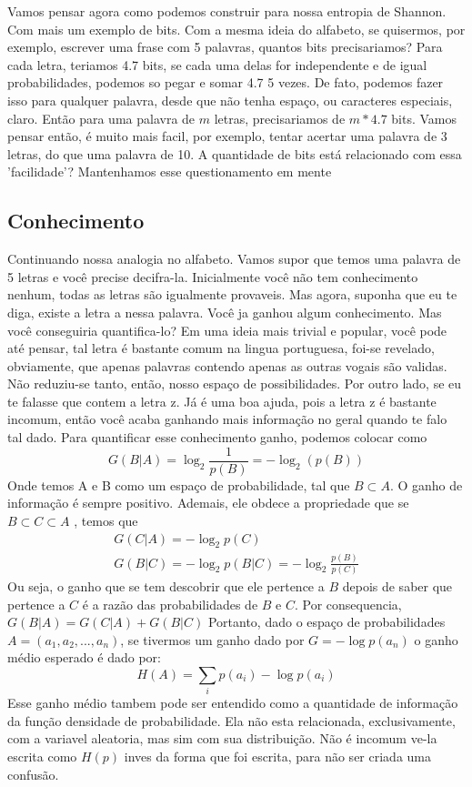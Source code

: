 Vamos pensar agora como podemos construir para nossa entropia de Shannon. Com mais um exemplo de
bits. Com a mesma ideia do alfabeto, se quisermos, por exemplo, escrever uma frase com 5 palavras,
quantos bits precisariamos? Para cada letra, teriamos 4.7 bits, se cada uma delas for independente e
de igual probabilidades, podemos so pegar e somar 4.7 5 vezes. De fato, podemos fazer isso para
qualquer palavra, desde que não tenha espaço, ou caracteres especiais, claro. Então para uma palavra
de \(m\) letras, precisariamos de \(m*4.7\) bits. Vamos pensar então, é muito mais facil, por
exemplo, tentar acertar uma palavra de 3 letras, do que uma palavra de 10. A quantidade de bits está
relacionado com essa 'facilidade'? Mantenhamos esse questionamento em mente

\subsection{Conhecimento}

Continuando nossa analogia no alfabeto. Vamos supor que temos uma palavra de 5 letras e você precise
decifra-la. Inicialmente você não tem conhecimento nenhum, todas as letras são igualmente provaveis.
Mas agora, suponha que eu te diga, existe a letra a nessa palavra. Você ja ganhou algum
conhecimento. Mas você conseguiria quantifica-lo? Em uma ideia mais trivial e popular, você pode até
pensar, tal letra é bastante comum na lingua portuguesa, foi-se revelado, obviamente, que apenas
palavras contendo apenas as outras vogais são validas. Não reduziu-se tanto, então, nosso espaço de
possibilidades. Por outro lado, se eu te falasse que contem a letra z. Já é uma boa ajuda, pois a
letra z é bastante incomum, então você acaba ganhando mais informação no geral quando te falo tal
dado. Para quantificar esse conhecimento ganho, podemos colocar como
\begin{equation}\label{eq:Ganho de informacao}
    G(B|A)=\log _2 \frac{1}{p(B)}=-\log _2(p(B))
\end{equation}
Onde temos A e B como um espaço de probabilidade, tal que \(B \subset A\). O ganho de informação é
sempre positivo. Ademais, ele obdece a propriedade que se \(B\subset C\subset A\) , temos que
\begin{align}
    G(C|A)=-\log _2p(C)\\
    G(B|C)=-\log _2p(B|C)=-\log _2\frac{p(B)}{p(C)}
\end{align}
Ou seja, o ganho que se tem descobrir que ele pertence a \(B\) depois de saber que pertence a \(C\)
é a razão das probabilidades de \(B\) e \(C\). Por consequencia, \(G(B|A)=G(C|A)+G(B|C)\) Portanto,
dado o espaço de probabilidades \(A=(a_1,a_2,...,a_n)\), se tivermos um ganho dado por
\(G=-\log p(a_n)\) o ganho médio esperado é dado por:
\begin{equation}\label{eq:Entropia de shannon}
    H(A)=\sum_i p(a_i) -\log p(a_i)
\end{equation}
Esse ganho médio tambem pode ser entendido como a quantidade de informação da função densidade de
probabilidade. Ela não esta relacionada, exclusivamente, com a variavel aleatoria, mas sim com sua
distribuição. Não é incomum ve-la escrita como \(H(p)\) inves da forma que foi escrita, para não ser
criada uma confusão.


